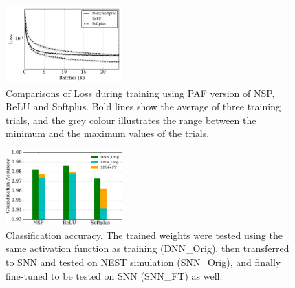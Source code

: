 \documentclass[10pt,journal,compsoc]{IEEEtran}
\begin{document}
	
	\begin{figure}[hb!]
			\includegraphics[width=0.4\textwidth]{pics_iconip/8.png}
			\caption{Comparisons of Loss during training using PAF version of NSP, ReLU and Softplus. Bold lines show the average of three training trials, and the grey colour illustrates the range between the minimum and the maximum values of the trials.}
			\label{Fig:loss_ns}
	\end{figure}
	\begin{figure}[hb]
			\includegraphics[width=0.4\textwidth]{pics_iconip/9-2.pdf}
			\caption{Classification accuracy.
			The trained weights were tested using the same activation function as training (DNN\_Orig), then transferred to SNN and tested on NEST simulation (SNN\_Orig), and finally fine-tuned to be tested on SNN (SNN\_FT) as well.  }
			\label{Fig:result_bar}
	\end{figure}


	
	
	
	
\end{document}
